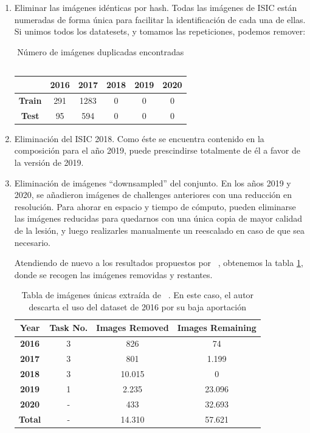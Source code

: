 \begin{enumerate}
	
	
	\item Eliminar las imágenes idénticas por hash. Todas las imágenes de ISIC están numeradas de forma única para facilitar la identificación de cada una de ellas. Si unimos todos los datatesets, y tomamos las repeticiones, podemos remover:
	
	\begin{table}[H]
		\centering
		\begin{tabular}{|c|c|c|c|c|c|}
			\hline
			\textbf{} & \textbf{2016} & \textbf{2017} & \textbf{2018} & \textbf{2019} & \textbf{2020} \\ \hline
			\textbf{Train} & 291 & 1283 & 0 & 0 & 0 \\ \hline
			\textbf{Test} & 95 & 594 & 0 & 0 & 0 \\ \hline
		\end{tabular}
		\caption{Número de imágenes duplicadas encontradas ~\cite{CASSIDY2022102305}}
	\end{table}
	
	
	\item 	Eliminación del ISIC 2018. Como éste se encuentra contenido en la composición para el año 2019, puede prescindirse totalmente de él a favor de la versión de 2019.
	\item 	Eliminación de imágenes “downsampled” del conjunto. En los años 2019 y 2020, se añadieron imágenes de challenges anteriores con una reducción en resolución. Para ahorar en espacio y tiempo de cómputo, pueden eliminarse las imágenes reducidas para quedarnos con una única copia de mayor calidad de la lesión, y luego realizarles manualmente un reescalado en caso de que sea necesario.
	
	Atendiendo de nuevo a los resultados propuestos por  ~\cite{CASSIDY2022102305}, obtenemos la tabla \ref{tab:isicresum}, donde se recogen las imágenes removidas y restantes.
	
	\begin{table}[H]
		\centering
		\begin{tabular}{|c|c|c|c|}
			\hline
			\textbf{Year} & \textbf{Task No.} & \textbf{Images Removed} & \textbf{Images Remaining} \\ \hline
			\textbf{2016} & 3 & 826 & 74 \\ \hline
			\textbf{2017} & 3 & 801 & 1.199 \\ \hline
			\textbf{2018} & 3 & 10.015 & 0 \\ \hline
			\textbf{2019} & 1 & 2.235 & 23.096 \\ \hline
			\textbf{2020} & - & 433 & 32.693 \\ \hline
			\textbf{Total} & - & 14.310 & 57.621 \\ \hline
		\end{tabular}
		\caption{Tabla de imágenes únicas extraída de ~\cite{CASSIDY2022102305}. En este caso, el autor descarta el uso del dataset de 2016 por su baja aportación}
		\label{tab:isicresum}
	\end{table}
	
\end{enumerate}

